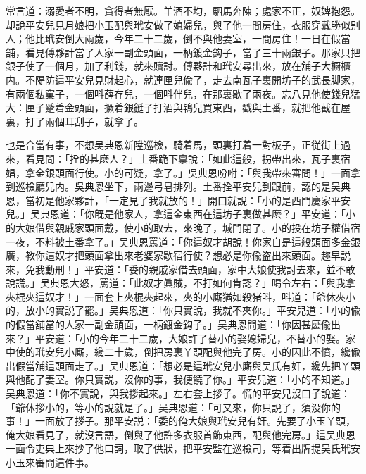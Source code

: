 常言道：溺愛者不明，貪得者無厭。羊酒不均，駟馬奔陳；處家不正，奴婢抱怨。却說平安兒見月娘把小玉配與玳安做了媳婦兒，與了他一間房住，衣服穿戴勝似别人；他比玳安倒大兩歲，今年二十二歲，倒不與他妻室，一間房住！一日在假當舖，看見傅夥計當了人家一副金頭面，一柄鍍金鈎子，當了三十兩銀子。那家只把銀子使了一個月，加了利錢，就來贖討。傅夥計和玳安尋出來，放在舖子大橱櫃内。不隄防這平安兒見財起心，就連匣兒偸了，走去南瓦子裏開坊子的武長脚家，有兩個私窠子，一個呌薛存兒，一個呌伴兒，在那裏歇了兩夜。忘八見他使錢兒猛大：匣子蹙着金頭面，撅着銀鋌子打酒與鴇兒買東西，戳與土番，就把他截在屋裏，打了兩個耳刮子，就拿了。

也是合當有事，不想吴典恩新陞巡檢，騎着馬，頭裏打着一對板子，正従街上過來，看見問：「拴的甚麽人？」土番跪下禀說：「如此這般，拐帶出來，瓦子裏宿娼，拿金銀頭面行使。小的可疑，拿了。」吳典恩吩咐：「與我帶來審問！」一面拿到巡檢廳兒内。吳典恩坐下，兩邊弓皂排列。土番拴平安兒到跟前，認的是吴典恩，當初是他家夥計，「一定見了我就放的！」開口就說：「小的是西門慶家平安兒。」吴典恩道：「你旣是他家人，拿這金東西在這坊子裏做甚麽？」平安道：「小的大娘借與親戚家頭面戴，使小的取去，來晚了，城門閉了。小的投在坊子權借宿一夜，不料被土番拿了。」吴典恩罵道：「你這奴才胡說！你家自是這般頭面多金銀廣，教你這奴才把頭面拿出來老婆家歇宿行使？想必是你偸盗出來頭面。趂早説來，免我動刑！」平安道：「委的親戚家借去頭面，家中大娘使我討去來，並不敢說謊。」吴典恩大怒，罵道：「此奴才眞賊，不打如何肯認？」喝令左右：「與我拿夾棍夾這奴才！」一面套上夾棍夾起來，夾的小廝猶如殺猪呌，呌道：「爺休夾小的，放小的實説了罷。」吴典恩道：「你只實說，我就不夾你。」平安兒道：「小的偸的假當舖當的人家一副金頭面，一柄鍍金鈎子。」吴典恩問道：「你因甚麽偸出來？」平安道：「小的今年二十二歲，大娘許了替小的娶媳婦兒，不替小的娶。家中使的玳安兒小廝，纔二十歲，倒把房裏丫頭配與他完了房。小的因此不憤，纔偸出假當舖這頭面走了。」吴典恩道：「想必是這玳安兒小廝與吴氏有奸，纔先把丫頭與他配了妻室。你只實説，沒你的事，我便饒了你。」平安兒道：「小的不知道。」吴典恩道：「你不實說，與我拶起來。」左右套上拶子。慌的平安兒沒口子說道：「爺休拶小的，等小的說就是了。」吴典恩道：「可又來，你只說了，須没你的事！」一面放了拶子。那平安説：「委的俺大娘與玳安兒有奸。先要了小玉丫頭，俺大娘看見了，就沒言語，倒與了他許多衣服首飾東西，配與他完房。」這吴典恩一面令吏典上來抄了他口詞，取了供狀，把平安監在巡檢司，等着出牌提吴氏玳安小玉來審問這件事。

